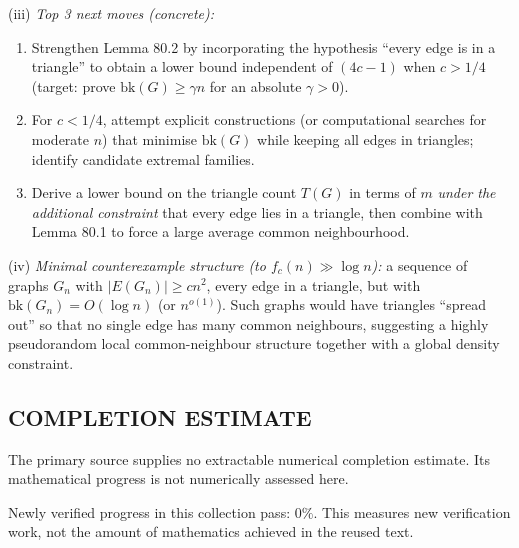 (iii) \emph{Top 3 next moves (concrete):}
\begin{enumerate}
\item Strengthen Lemma 80.2 by incorporating the hypothesis ``every edge is in a triangle'' to obtain a lower bound independent of $(4c-1)$ when $c>1/4$ (target: prove $\mathrm{bk}(G)\ge \gamma n$ for an absolute $\gamma>0$).
\item For $c<1/4$, attempt explicit constructions (or computational searches for moderate $n$) that minimise $\mathrm{bk}(G)$ while keeping all edges in triangles; identify candidate extremal families.
\item Derive a lower bound on the triangle count $T(G)$ in terms of $m$ \emph{under the additional constraint} that every edge lies in a triangle, then combine with Lemma 80.1 to force a large average common neighbourhood.
\end{enumerate}

(iv) \emph{Minimal counterexample structure (to $f_c(n)\gg \log n$):} a sequence of graphs $G_n$ with $|E(G_n)|\ge c n^2$, every edge in a triangle, but with $\mathrm{bk}(G_n)=O(\log n)$ (or $n^{o(1)}$). Such graphs would have triangles ``spread out'' so that no single edge has many common neighbours, suggesting a highly pseudorandom local common-neighbour structure together with a global density constraint.




\subsection*{COMPLETION ESTIMATE}
The primary source supplies no extractable numerical completion estimate. Its mathematical progress is not numerically assessed here.

Newly verified progress in this collection pass: $0\%$. This measures new verification work, not the amount of mathematics achieved in the reused text.
